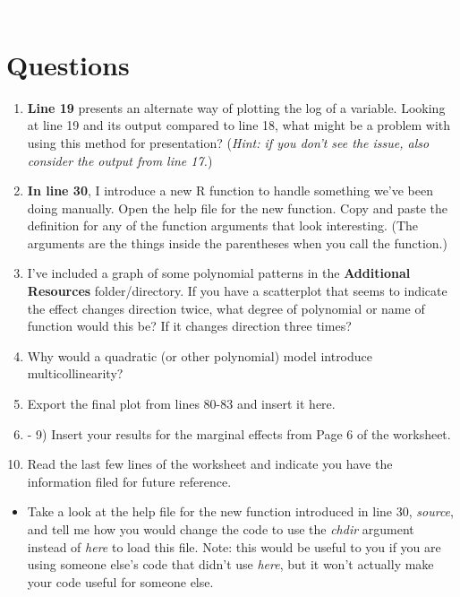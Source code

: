 \documentclass[12pt]{article}
\begin{document}
	
	

	
	{\textcolor{white}.}
	

	
	\section*{Questions}
	
	\begin{enumerate}[label=\arabic*)]
	\item \textbf{Line 19} presents an alternate way of plotting the log of a variable. Looking at line 19 and its output compared to line 18, what might be a problem with using this method for presentation?  (\textit{Hint: if you don't see the issue, also consider the output from line 17.}) 
	\item \textbf{In line 30}, I introduce a new R function to handle something we've been doing manually. Open the help file for the new function. Copy and paste the definition for any of the function arguments that look interesting. (The arguments are the things inside the parentheses when you call the function.)
	\item I've included a graph of some polynomial patterns in the \textbf{Additional Resources} folder/directory. If you have a scatterplot that seems to indicate the effect changes direction twice, what degree of polynomial or name of function would this be? If it changes direction three times?
	\item Why would a quadratic (or other polynomial) model introduce multicollinearity?
	\item Export the final plot from lines 80-83 and insert it here.
	\item - 9) Insert your results for the marginal effects from Page 6 of the worksheet. 
	
	\end{enumerate}
	
	\begin{enumerate}[label=\arabic*)]
	\setcounter{enumi}{9}
	\item Read the last few lines of the worksheet and indicate you have the information filed for future reference. 
	\end{enumerate}
	
	\begin{itemize}[label=Extra Credit]
	\item Take a look at the help file for the new function introduced in line 30, \textit{source}, and tell me how you would change the code to use the \textit{chdir} argument instead of \textit{here} to load this file. Note: this would be useful to you if you are using someone else's code that didn't use \textit{here}, but it won't actually make your code useful for someone else. 	
	\end{itemize}
	
\end{document}
